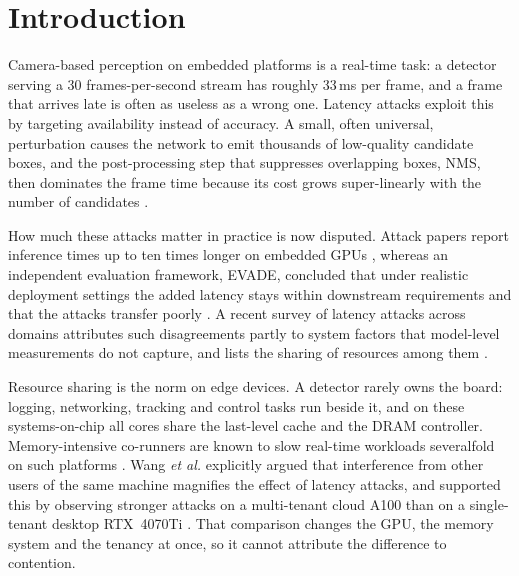 \documentclass[conference]{IEEEtran}
\begin{document}
\section{Introduction}
Camera-based perception on embedded platforms is a real-time task: a detector serving a 30
frames-per-second stream has roughly 33\,ms per frame, and a frame that arrives late is often as
useless as a wrong one. Latency attacks exploit this by targeting availability instead of
accuracy. A small, often universal, perturbation causes the network to emit thousands of
low-quality candidate boxes, and the post-processing step that suppresses overlapping boxes,
NMS, then dominates the frame time because its cost grows super-linearly with the number of
candidates \cite{wang2021daedalus,shapira2023phantom,chen2024overload}.

How much these attacks matter in practice is now disputed. Attack papers report
inference times up to ten times longer on embedded GPUs \cite{chen2024overload}, whereas an
independent evaluation framework, EVADE, concluded that under realistic deployment settings the
added latency stays within downstream requirements and that the attacks transfer poorly
\cite{monteuuis2025evade}. A recent survey of latency attacks across domains attributes such
disagreements partly to system factors that model-level measurements do not capture, and lists
the sharing of resources among them \cite{gu2026survey}.

Resource sharing is the norm on edge devices. A detector rarely owns the board: logging,
networking, tracking and control tasks run beside it, and on these systems-on-chip all cores
share the last-level cache and the DRAM controller. Memory-intensive co-runners are known to
slow real-time workloads severalfold on such platforms
\cite{valsan2016isolbench,ali2018bwlock,bechtel2018deeppicar}. Wang \emph{et al.} explicitly argued that
interference from other users of the same machine magnifies the effect of latency attacks, and
supported this by observing stronger attacks on a multi-tenant cloud A100 than on a single-tenant
desktop RTX~4070Ti \cite{wang2025cantslow}. That comparison changes the GPU, the memory system
and the tenancy at once, so it cannot attribute the difference to contention.
\end{document}
